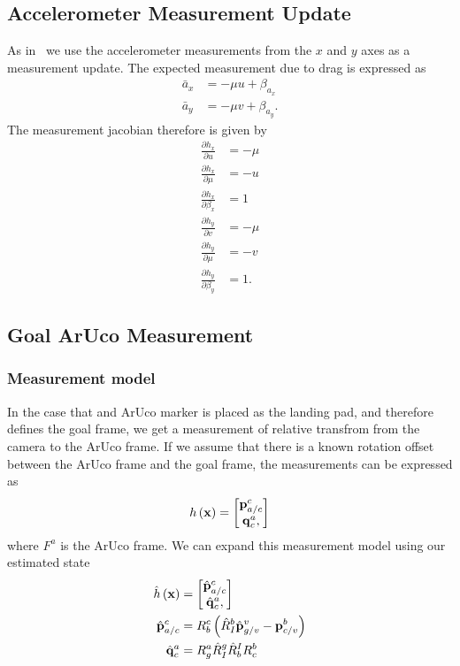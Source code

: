 \subsection{Accelerometer Measurement Update}
As in~\cite{leishman2014accel} we use the accelerometer measurements from the
$x$ and $y$ axes as a measurement update. The expected measurement due to drag
is expressed as
\begin{align}
  \bar{a}_x &= -\mu u + \beta_{a_x} \\
  \bar{a}_y &= -\mu v + \beta_{a_y}.
\end{align}
The measurement jacobian therefore is given by
\begin{align}
  \frac{\partial h_x}{\partial u} &= -\mu \\
  \frac{\partial h_x}{\partial \mu} &= -u \\
  \frac{\partial h_x}{\partial \beta_x} &= 1 \\
  \frac{\partial h_y}{\partial v} &= -\mu \\
  \frac{\partial h_y}{\partial \mu} &= -v \\
  \frac{\partial h_y}{\partial \beta_y} &= 1.
\end{align}

\subsection{Goal ArUco Measurement}
\subsubsection{Measurement model}
In the case that and ArUco marker is placed as the landing pad, and therefore
defines the goal frame, we get a measurement of relative transfrom from the
camera to the ArUco frame. If we assume that there is a known rotation offset
between the ArUco frame and the goal frame, the measurements can be expressed as
\begin{equation}
  h \left( \boldsymbol{\mathrm{x}} \right) = 
  \begin{bmatrix}
    \boldsymbol{\mathrm{p}}_{a/c}^c \\
    \boldsymbol{\mathrm{q}}_c^a,
  \end{bmatrix}
\end{equation}
where $F^a$ is the ArUco frame.
We can expand this measurement model using our estimated state
\begin{align}
  \hat{h} \left( \boldsymbol{\mathrm{x}} \right) &=
  \begin{bmatrix}
    \hat{\boldsymbol{\mathrm{p}}}_{a/c}^c \\
    \hat{\boldsymbol{\mathrm{q}}}_c^a,
  \end{bmatrix} \\
  \hat{\boldsymbol{\mathrm{p}}}_{a/c}^c  &= R_b^c \left( \hat{R}_I^b \hat{\boldsymbol{\mathrm{p}}}_{g/v}^v -
    \boldsymbol{\mathrm{p}}_{c/v}^b \right) \\
  \hat{\boldsymbol{\mathrm{q}}}_{c}^a  &= R_g^a \hat{R}_I^g \hat{R}_b^I R_c^b
\end{align}

